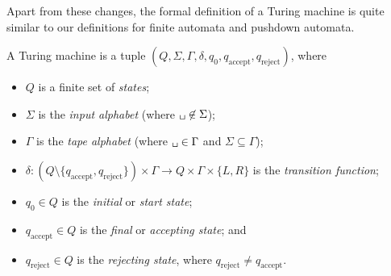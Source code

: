 Apart from these changes, the formal definition of a Turing machine is quite similar to our definitions for finite automata and pushdown automata.

\begin{definition}\label{def:TM}
A Turing machine is a tuple $(Q, \Sigma, \Gamma, \delta, q_{0}, q_{\text{accept}}, q_{\text{reject}})$, where
\begin{itemize}
\item $Q$ is a finite set of \emph{states};
\item $\Sigma$ is the \emph{input alphabet} (where $\blankspace \not\in \Sigma$);
\item $\Gamma$ is the \emph{tape alphabet} (where $\blankspace \in \Gamma$ and $\Sigma \subseteq \Gamma$);
\item $\delta: (Q \setminus \{q_{\text{accept}}, q_{\text{reject}}\}) \times \Gamma \to Q \times \Gamma \times \{L, R\}$ is the \emph{transition function};
\item $q_{0} \in Q$ is the \emph{initial} or \emph{start state};
\item $q_{\text{accept}} \in Q$ is the \emph{final} or \emph{accepting state}; and
\item $q_{\text{reject}} \in Q$ is the \emph{rejecting state}, where $q_{\text{reject}} \neq q_{\text{accept}}$.
\end{itemize}
\end{definition}

